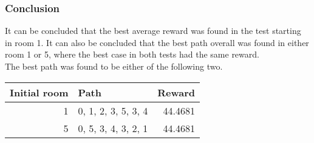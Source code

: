 \documentclass[../Head/Main.tex]{subfiles}
\begin{document}
\subsubsection*{Conclusion}
It can be concluded that the best average reward was found in the test starting in room 1. It can also be concluded that the best path overall was found in either room 1 or 5, where the best case in both tests had the same reward.\\
The best path was found to be either of the following two.\par 
\begin{minipage}[b]{\textwidth}
	\centering
	\begin{tabular}{r l r}
	\hline
	\multicolumn{1}{l}{\textbf{Initial room}} & \textbf{Path} & \textbf{Reward} \\ 			\hline
	1  & 0, 1, 2, 3, 5, 3, 4  & 44.4681\\
	5  & 0, 5, 3, 4, 3, 2, 1  & 44.4681\\
	\hline
\end{tabular}
\end{minipage}
\end{document}
